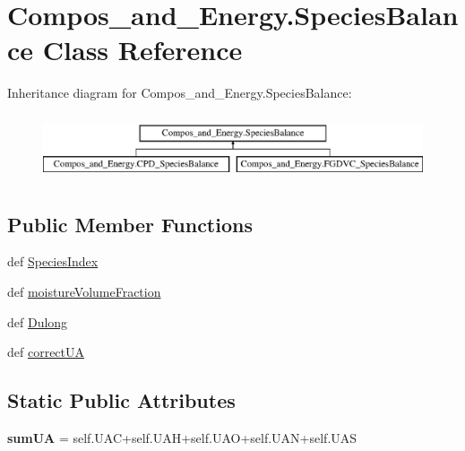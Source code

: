 \hypertarget{classCompos__and__Energy_1_1SpeciesBalance}{\section{\-Compos\-\_\-and\-\_\-\-Energy.\-Species\-Balance \-Class \-Reference}
\label{classCompos__and__Energy_1_1SpeciesBalance}
}
\-Inheritance diagram for \-Compos\-\_\-and\-\_\-\-Energy.\-Species\-Balance\-:\begin{figure}[H]
\begin{center}
\leavevmode
\includegraphics[height=1.951219cm]{classCompos__and__Energy_1_1SpeciesBalance}
\end{center}
\end{figure}
\subsection*{\-Public \-Member \-Functions}
\begin{DoxyCompactItemize}
\item 
def \hyperlink{classCompos__and__Energy_1_1SpeciesBalance_a5fec9a8d342543711abe2fc10632efb0}{\-Species\-Index}
\item 
def \hyperlink{classCompos__and__Energy_1_1SpeciesBalance_ae6b9b1a304a5b3686888725624c5e329}{moisture\-Volume\-Fraction}
\item 
def \hyperlink{classCompos__and__Energy_1_1SpeciesBalance_abeff1c726b62ba6c2d32173eb7f51d48}{\-Dulong}
\item 
def \hyperlink{classCompos__and__Energy_1_1SpeciesBalance_a05ae92b73a997e779c64bd2e6386a918}{correct\-U\-A}
\end{DoxyCompactItemize}
\subsection*{\-Static \-Public \-Attributes}
\begin{DoxyCompactItemize}
\item 
\hypertarget{classCompos__and__Energy_1_1SpeciesBalance_a57d64961c8e035bf8087528adf669379}{{\bfseries sum\-U\-A} = self.\-U\-A\-C+self.\-U\-A\-H+self.\-U\-A\-O+self.\-U\-A\-N+self.\-U\-A\-S}\label{classCompos__and__Energy_1_1SpeciesBalance_a57d64961c8e035bf8087528adf669379}

\end{DoxyCompactItemize}


